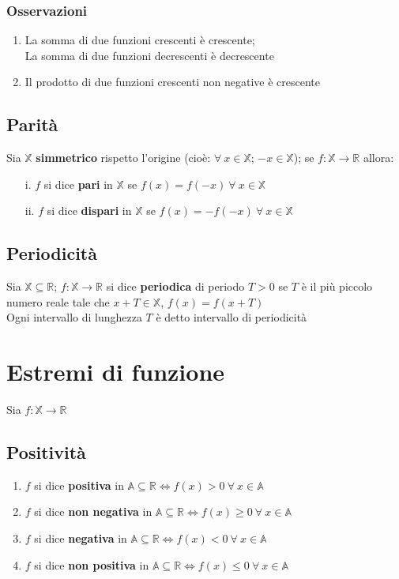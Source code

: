 \subsubsection{Osservazioni}
\begin{enumerate}
\item La somma di due funzioni crescenti è crescente;\\
La somma di due funzioni decrescenti è decrescente
\item Il prodotto di due funzioni crescenti non negative è crescente
\end{enumerate}

\subsection{Parità}
Sia $\mathbb{X}$ \textbf{simmetrico} rispetto l'origine (cioè: $\forall\ x \in \mathbb{X}$; $-x \in \mathbb{X}$); se $f: \mathbb{X} \rightarrow \mathbb{R}$ allora:
\begin{enumerate}
\item[i.] $f$ si dice \textbf{pari} in $\mathbb{X}$ se $f(x) = f(-x)\ \forall\ x \in \mathbb{X}$
\item[ii.] $f$ si dice \textbf{dispari} in $\mathbb{X}$ se $f(x) = -f(-x)\ \forall\ x \in \mathbb{X}$
\end{enumerate}

\subsection{Periodicità}
Sia $\mathbb{X} \subseteq \mathbb{R}$;   $f: \mathbb{X} \rightarrow \mathbb{R}$ si dice \textbf{periodica} di periodo $T>0$ se $T$ è il più piccolo numero reale tale che $x + T \in \mathbb{X}$, $f(x) = f(x + T)$\\
Ogni intervallo di lunghezza $T$ è detto intervallo di periodicità

\section{Estremi di funzione}
Sia $f: \mathbb{X} \rightarrow \mathbb{R}$
\subsection{Positività}
\begin{enumerate}
\item $f$ si dice \textbf{positiva} in $\mathbb{A} \subseteq \mathbb{R} \iff f(x)>0\ \forall\ x \in \mathbb{A}$
\item $f$ si dice \textbf{non negativa} in $\mathbb{A} \subseteq \mathbb{R} \iff f(x) \geq 0\ \forall\ x \in \mathbb{A}$
\item $f$ si dice \textbf{negativa} in $\mathbb{A} \subseteq \mathbb{R} \iff f(x)<0\ \forall\ x \in \mathbb{A}$
\item $f$ si dice \textbf{non positiva} in $\mathbb{A} \subseteq \mathbb{R} \iff f(x) \leq 0\ \forall\ x \in \mathbb{A}$
\end{enumerate}
